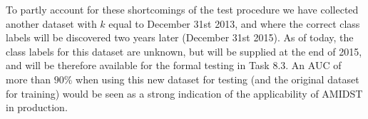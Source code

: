 \documentclass{article}
\theoremstyle{theorem}
\theoremstyle{definition}
\begin{document}
To partly account for these shortcomings of the test procedure we have collected another dataset with $k$ equal to December 31st 2013, and where the correct class labels will be discovered two years later (December 31st 2015).
As of today, the class labels for this dataset are unknown, but will be supplied at the end of 2015, and will be therefore available for the formal testing in Task 8.3. 
An AUC of more than $90\%$ when using this new dataset for testing (and the original dataset for training) would be seen as a strong indication of the applicability of AMIDST in production.





%
%
%
%
%
%
\end{document}
